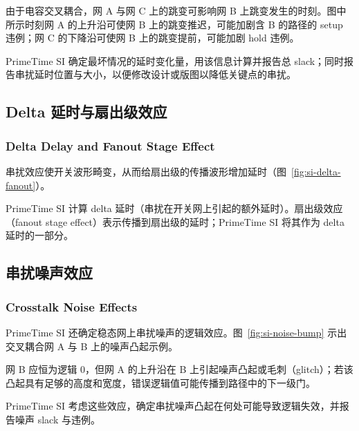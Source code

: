 
由于电容交叉耦合，网 A 与网 C 上的跳变可影响网 B 上跳变发生的时刻。图中所示时刻网 A 的上升沿可使网 B 上的跳变推迟，可能加剧含 B 的路径的 setup 违例；网 C 的下降沿可使网 B 上的跳变提前，可能加剧 hold 违例。

PrimeTime SI 确定最坏情况的延时变化量，用该信息计算并报告总 slack；同时报告串扰延时位置与大小，以便修改设计或版图以降低关键点的串扰。

\subsection{Delta 延时与扇出级效应}
\subsubsection*{Delta Delay and Fanout Stage Effect}

串扰效应使开关波形畸变，从而给扇出级的传播波形增加延时（图~\ref{fig:si-delta-fanout}）。


PrimeTime SI 计算 delta 延时（串扰在开关网上引起的额外延时）。扇出级效应（fanout stage effect）表示传播到扇出级的延时；PrimeTime SI 将其作为 delta 延时的一部分。

\subsection{串扰噪声效应}
\subsubsection*{Crosstalk Noise Effects}

PrimeTime SI 还确定稳态网上串扰噪声的逻辑效应。图~\ref{fig:si-noise-bump} 示出交叉耦合网 A 与 B 上的噪声凸起示例。


网 B 应恒为逻辑 0，但网 A 的上升沿在 B 上引起噪声凸起或毛刺（glitch）；若该凸起具有足够的高度和宽度，错误逻辑值可能传播到路径中的下一级门。

PrimeTime SI 考虑这些效应，确定串扰噪声凸起在何处可能导致逻辑失效，并报告噪声 slack 与违例。

